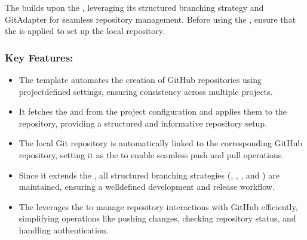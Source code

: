 \documentclass[letterpaper,10pt,english]{sphinxhowto}
\begin{document}
\sphinxAtStartPar
{}
The  builds upon the , leveraging its structured branching strategy and GitAdapter for seamless repository management. Before using the , ensure that the  is applied to set up the local repository.


\subsubsection{Key Features:}
\label{\detokenize{templates/github/index:key-features}}\begin{itemize}
\item {} 
\sphinxAtStartPar
{}
The template automates the creation of GitHub repositories using project\sphinxhyphen{}defined settings, ensuring consistency across multiple projects.

\item {} 
\sphinxAtStartPar
{}
It fetches the  and  from the project configuration and applies them to the repository, providing a structured and informative repository setup.

\item {} 
\sphinxAtStartPar
{}
The local Git repository is automatically linked to the corresponding GitHub repository, setting it as the  to enable seamless push and pull operations.

\item {} 
\sphinxAtStartPar
{}
Since it extends the , all structured branching strategies (, , , and ) are maintained, ensuring a well\sphinxhyphen{}defined development and release workflow.

\item {} 
\sphinxAtStartPar
{}
The  leverages the  to manage repository interactions with GitHub efficiently, simplifying operations like pushing changes, checking repository status, and handling authentication.

\end{itemize}
\end{document}
